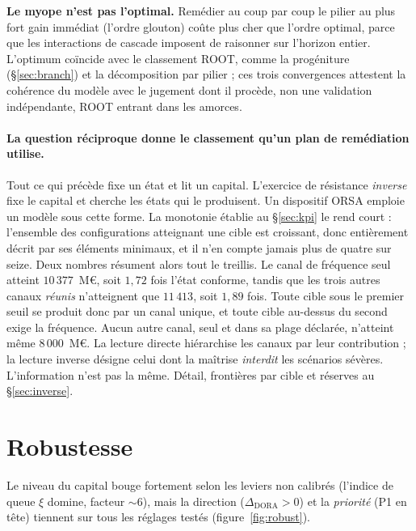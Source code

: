 \begin{cle}
\textbf{Le myope n'est pas l'optimal.} Remédier au coup par coup le pilier au plus fort gain
immédiat (l'ordre glouton) coûte plus cher que l'ordre optimal, parce que les interactions de
cascade imposent de raisonner sur l'horizon entier. L'optimum coïncide avec le classement
ROOT, comme la progéniture (\S\ref{sec:branch}) et la décomposition par pilier ; ces trois
convergences attestent la cohérence du modèle avec le jugement dont il procède, non une
validation indépendante, ROOT entrant dans les amorces.
\end{cle}

\paragraph{La question réciproque donne le classement qu'un plan de
remédiation utilise.} Tout ce qui précède fixe un état et lit un capital. L'exercice de
résistance \emph{inverse} fixe le capital et cherche les états qui le produisent. Un dispositif ORSA emploie un modèle sous
cette forme. La monotonie établie au \S\ref{sec:kpi} le
rend court : l'ensemble des configurations atteignant une cible est croissant, donc entièrement
décrit par ses éléments minimaux, et il n'en compte jamais plus de quatre sur seize. Deux nombres
résument alors tout le treillis. Le canal de fréquence seul atteint $10\,377$~M\euro,
soit $1{,}72$ fois l'état conforme, tandis que les trois autres canaux \emph{réunis} n'atteignent
que $11\,413$, soit $1{,}89$ fois. Toute cible sous le premier seuil se produit donc par un canal
unique, et toute cible au-dessus du second exige la fréquence. Aucun autre canal, seul et
dans sa plage déclarée, n'atteint même $8\,000$~M\euro. La lecture directe hiérarchise les canaux
par leur contribution ; la lecture inverse désigne celui dont la maîtrise \emph{interdit} les
scénarios sévères. L'information n'est pas la même. Détail, frontières par cible et réserves
au \S\ref{sec:inverse}.

\section{Robustesse}

Le niveau du capital bouge fortement selon les leviers non calibrés (l'indice de queue $\xi$
domine, facteur $\sim 6$), mais la direction ($\Delta_{\text{DORA}}>0$) et la
\emph{priorité} (P1 en tête) tiennent sur tous les réglages testés (figure~\ref{fig:robust}).

